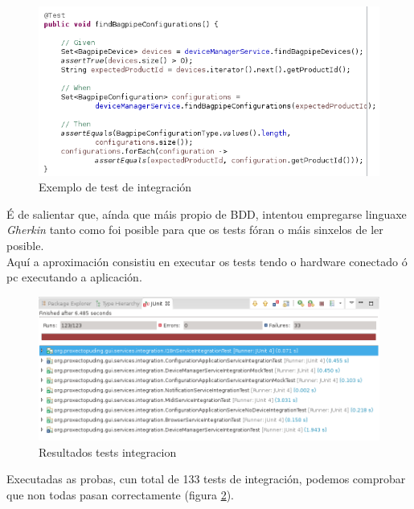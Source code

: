   \begin{figure}[htbp]
   \centering
   \includegraphics[scale=0.8,keepaspectratio=true]{./imagenes/test-integracion.png}
   \caption{Exemplo de test de integración}
   \label{figura:TestIntegracion}
  \end{figure}
  
  É de salientar que, aínda que máis propio de BDD, intentou empregarse linguaxe
  \textit{Gherkin} \cite{Gherkin} tanto como foi posible para que os tests fóran
  o máis sinxelos de ler posible. \\
 
 Aquí a aproximación consistiu en executar os tests tendo o hardware conectado ó
 pc executando a aplicación. \\
 
 \begin{figure}[htbp]
  \centering
  \includegraphics[scale=0.6,keepaspectratio=true]{./imagenes/resultados-tests-integracion.png}
  \caption{Resultados tests integracion}
  \label{figura:ResultadosTestIntegracion}
 \end{figure}
  
 Executadas as probas, cun total de 133 tests de integración, podemos comprobar
 que non todas pasan correctamente
 (figura \ref{figura:ResultadosTestIntegracion}). \\
 
